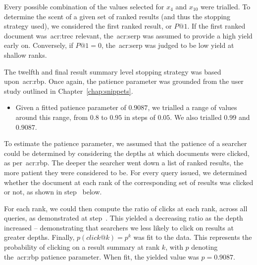 Every possible combination of the values selected for $x_4$ and $x_{10}$ were trialled. To determine the scent of a given set of ranked results (and thus the stopping strategy used), we considered the first ranked result, or $P@1$. If the first ranked document was~\gls{acr:trec} relevant, the~\gls{acr:serp} was assumed to provide a high yield early on. Conversely, if $P@1=0$, the~\gls{acr:serp} was judged to be low yield at shallow ranks.

The twelfth and final result summary level stopping strategy was based upon~\gls{acr:rbp}. Once again, the patience parameter was grounded from the user study outlined in Chapter~\ref{chap:snippets}.

\begin{itemize}
    \item{ Given a fitted patience parameter of $0.9087$, we trialled a range of values around this range, from $0.8$ to $0.95$ in steps of $0.05$. We also trialled $0.99$ and $0.9087$.}
\end{itemize}

To estimate the patience parameter, we assumed that the patience of a searcher could be determined by considering the depths at which documents were clicked, as per~\gls{acr:rbp}. The deeper the searcher went down a list of ranked results, the more patient they were considered to be. For every query issued, we determined whether the document at each rank of the corresponding set of results was clicked or not, as shown in step~ below.

\begin{figure}[h]
    \centering
    \vspace{1mm}
    \label{fig:rbp_patience}
    \vspace{-7mm}
\end{figure}

For each rank, we could then compute the ratio of clicks at each rank, across all queries, as demonstrated at step~. This yielded a decreasing ratio as the depth increased -- demonstrating that searchers we less likely to click on results at greater depths. Finally, $p(click@k) = p^k$ was fit to the data. This represents the probability of clicking on a result summary at rank $k$, with $p$ denoting the~\gls{acr:rbp} patience parameter. When fit, the yielded value was $p=0.9087$.

